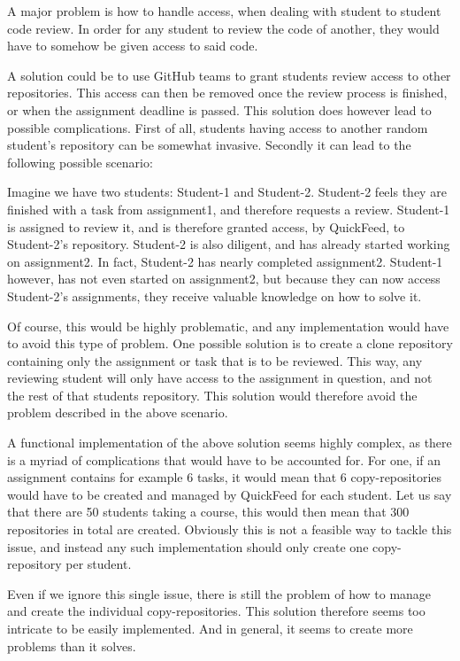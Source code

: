 A major problem is how to handle access, when dealing with student to student code review.
In order for any student to review the code of another, they would have to somehow be given access to said code.

A solution could be to use GitHub teams to grant students review access to other repositories.
This access can then be removed once the review process is finished, or when the assignment deadline is passed.
This solution does however lead to possible complications.
First of all, students having access to another random student's repository can be somewhat invasive.
Secondly it can lead to the following possible scenario:

Imagine we have two students: Student-1 and Student-2.
Student-2 feels they are finished with a task from assignment1, and therefore requests a review.
Student-1 is assigned to review it, and is therefore granted access, by QuickFeed, to Student-2's repository.
Student-2 is also diligent, and has already started working on assignment2.
In fact, Student-2 has nearly completed assignment2.
Student-1 however, has not even started on assignment2, but because they can now access Student-2's assignments, they receive valuable knowledge on how to solve it.

Of course, this would be highly problematic, and any implementation would have to avoid this type of problem.
One possible solution is to create a clone repository containing only the assignment or task that is to be reviewed. 
This way, any reviewing student will only have access to the assignment in question, and not the rest of that students repository.
This solution would therefore avoid the problem described in the above scenario.

A functional implementation of the above solution seems highly complex, as there is a myriad of complications that would have to be accounted for.
For one, if an assignment contains for example 6 tasks, it would mean that 6 copy-repositories would have to be created and managed by QuickFeed for each student.
Let us say that there are 50 students taking a course, this would then mean that 300 repositories in total are created.
Obviously this is not a feasible way to tackle this issue, and instead any such implementation should only create one copy-repository per student.

Even if we ignore this single issue, there is still the problem of how to manage and create the individual copy-repositories.
This solution therefore seems too intricate to be easily implemented.
And in general, it seems to create more problems than it solves.

